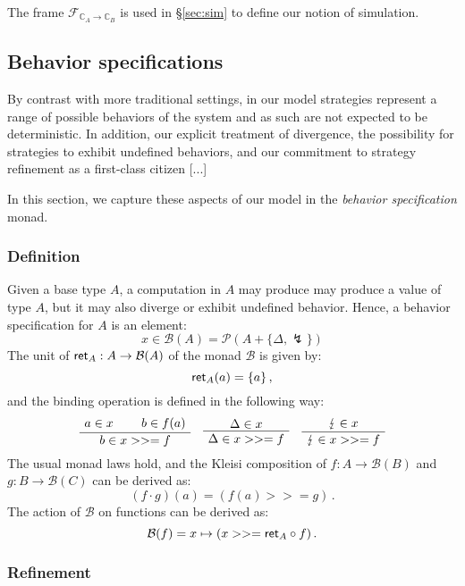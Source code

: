 The frame $\mathcal{F}_{\mathbb{C}_A \rightarrow \mathbb{C}_B}$
is used in \S\ref{sec:sim}
to define our notion of simulation.



\subsection{Behavior specifications} %

By contrast with more traditional settings,
in our model strategies represent a range of possible behaviors
of the system and as such are not expected to be deterministic.
In addition,
our explicit treatment of divergence,
the possibility for strategies to exhibit undefined behaviors,
and our commitment to strategy refinement as a first-class citizen
[...]

In this section,
we capture these aspects of our model
in the \emph{behavior specification} monad.

\subsubsection{Definition}

Given a base type $A$,
a computation in $A$ may produce 
may produce a value of type $A$,
but it may also diverge or exhibit undefined behavior.
Hence,
a behavior specification for $A$ is an element:
\[
    x \in \mathcal{B}(A) = \mathcal{P}(A + \{ \Delta, \lightning \})
\]
The unit of $ \mathsf{ret} _A : A \rightarrow \mathcal{B}(A)$
of the monad $\mathcal{B}$ is given by:
\[
     \mathsf{ret} _A(a) = \{ a \} \,,
\]
and the binding operation is defined in the following way:
\[
    \AxiomC{$a \in x$}
    \AxiomC{$b \in f(a)$}
    \BinaryInfC{$b \in x >>= f$}
    \DisplayProof
    \quad
    \AxiomC{$\Delta \in x$}
    \UnaryInfC{$\Delta \in x >>= f$}
    \DisplayProof
    \quad
    \AxiomC{$\lightning \in x$}
    \UnaryInfC{$\lightning \in x >>= f$}
    \DisplayProof
\]
The usual monad laws hold, and
the Kleisi composition of $f : A \rightarrow \mathcal{B}(B)$ and
$g : B \rightarrow \mathcal{B}(C)$ can be derived as:
\[
    (f \cdot g)(a) = (f(a) >>= g) \,.
\]
The action of $\mathcal{B}$ on functions can be derived as:
\[
    \mathcal{B}(f) = x \mapsto (x >>=  \mathsf{ret} _A \circ f) \,.
\]


\subsubsection{Refinement}

